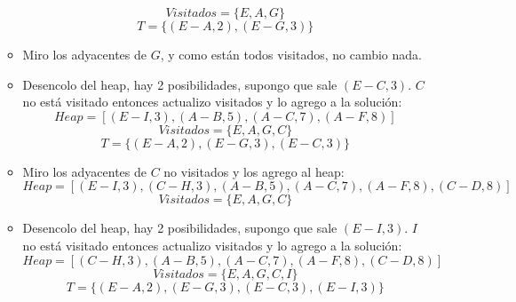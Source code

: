 \documentclass{article}
\begin{document}
\begin{enumerate}[label=\alph*)]
\begin{itemize}
                \begin{equation*}
                    Visitados = \{E, A, G\}
                \end{equation*}
                \begin{equation*}
                    T = \{(E-A, 2), (E-G, 3)\}
                \end{equation*}
            \item Miro los adyacentes de $G$, y como están todos visitados, no cambio nada.
            \item Desencolo del heap, hay 2 posibilidades, supongo que sale $(E-C, 3)$. $C$ no está visitado entonces actualizo visitados y lo agrego a la solución:
                \begin{equation*}
                    Heap = [(E-I, 3), (A-B, 5), (A-C, 7), (A-F, 8)]
                \end{equation*}
                \begin{equation*}
                    Visitados = \{E, A, G, C\}
                \end{equation*}
                \begin{equation*}
                    T = \{(E-A, 2), (E-G, 3), (E-C, 3)\}
                \end{equation*}
            \item Miro los adyacentes de $C$ no visitados y los agrego al heap:
                \begin{equation*}
                    Heap = [(E-I, 3), (C-H, 3), (A-B, 5), (A-C, 7), (A-F, 8), (C-D, 8)]
                \end{equation*}
                \begin{equation*}
                    Visitados = \{E, A, G, C\}
                \end{equation*}
            \item Desencolo del heap, hay 2 posibilidades, supongo que sale $(E-I, 3)$. $I$ no está visitado entonces actualizo visitados y lo agrego a la solución:
                \begin{equation*}
                    Heap = [(C-H, 3), (A-B, 5), (A-C, 7), (A-F, 8), (C-D, 8)]
                \end{equation*}
                \begin{equation*}
                    Visitados = \{E, A, G, C, I\}
                \end{equation*}
                \begin{equation*}
                    T = \{(E-A, 2), (E-G, 3), (E-C, 3), (E-I, 3)\}

\end{equation*}
\end{itemize}
\end{enumerate}
\end{document}
